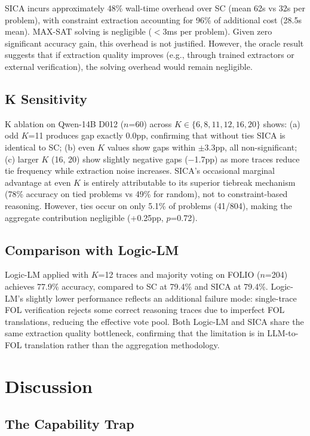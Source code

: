 \documentclass[11pt,a4paper]{article}
\begin{document}
SICA incurs approximately 48\% wall-time overhead over SC (mean 62s vs 32s per problem), with constraint extraction accounting for 96\% of additional cost (28.5s mean). MAX-SAT solving is negligible ($<$3ms per problem). Given zero significant accuracy gain, this overhead is not justified. However, the oracle result suggests that if extraction quality improves (e.g., through trained extractors or external verification), the solving overhead would remain negligible.

\subsection{K Sensitivity}

K ablation on Qwen-14B D012 ($n$=60) across $K \in \{6, 8, 11, 12, 16, 20\}$ shows: (a) odd $K$=11 produces gap exactly 0.0pp, confirming that without ties SICA is identical to SC; (b) even $K$ values show gaps within $\pm$3.3pp, all non-significant; (c) larger $K$ (16, 20) show slightly negative gaps ($-$1.7pp) as more traces reduce tie frequency while extraction noise increases. SICA's occasional marginal advantage at even $K$ is entirely attributable to its superior tiebreak mechanism (78\% accuracy on tied problems vs 49\% for random), not to constraint-based reasoning. However, ties occur on only 5.1\% of problems (41/804), making the aggregate contribution negligible (+0.25pp, $p$=0.72).

\subsection{Comparison with Logic-LM}

Logic-LM applied with $K$=12 traces and majority voting on FOLIO ($n$=204) achieves 77.9\% accuracy, compared to SC at 79.4\% and SICA at 79.4\%. Logic-LM's slightly lower performance reflects an additional failure mode: single-trace FOL verification rejects some correct reasoning traces due to imperfect FOL translations, reducing the effective vote pool. Both Logic-LM and SICA share the same extraction quality bottleneck, confirming that the limitation is in LLM-to-FOL translation rather than the aggregation methodology.

\section{Discussion}

\subsection{The Capability Trap}
\end{document}
